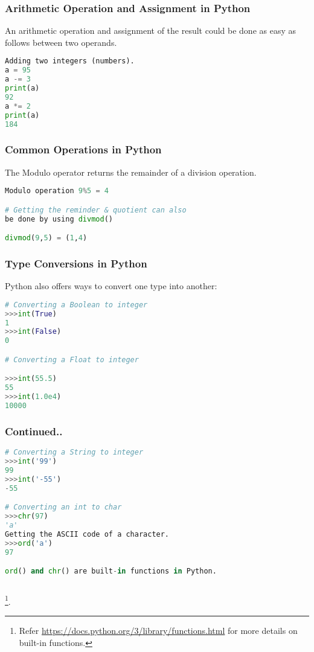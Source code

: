 \documentclass{beamer}
\begin{document}
\begin{frame}[fragile]
\frametitle{Arithmetic Operation and Assignment in Python}
An arithmetic operation and assignment of the result could be done as easy as follows between two operands.

\begin{lstlisting}[language=Python]
Adding two integers (numbers).
a = 95
a -= 3
print(a)
92
a *= 2
print(a)
184
\end{lstlisting}
\end{frame}

\begin{frame}[fragile]
\frametitle{Common Operations in Python}
The Modulo operator returns the remainder of a division operation.
\begin{lstlisting}[language=Python]
Modulo operation 9%5 = 4

# Getting the reminder & quotient can also 
be done by using divmod()

divmod(9,5) = (1,4)

\end{lstlisting}
\end{frame}

\begin{frame}[fragile]
\frametitle{Type Conversions in Python}
Python also offers ways to convert one type into another:

\begin{lstlisting}[language=Python]
# Converting a Boolean to integer
>>>int(True)
1
>>>int(False)
0

# Converting a Float to integer

>>>int(55.5)
55
>>>int(1.0e4)
10000

\end{lstlisting}
\end{frame}
\begin{frame}[fragile]
\frametitle{Continued..}
\begin{lstlisting}[language=Python]
# Converting a String to integer
>>>int('99')
99
>>>int('-55')	
-55

# Converting an int to char
>>>chr(97)
'a'
Getting the ASCII code of a character.
>>>ord('a')
97

ord() and chr() are built-in functions in Python.
 
\end{lstlisting}
\footnote{\tiny{Refer \url{https://docs.python.org/3/library/functions.html} for more details on built-in functions.}}.
\end{frame}
\end{document}
